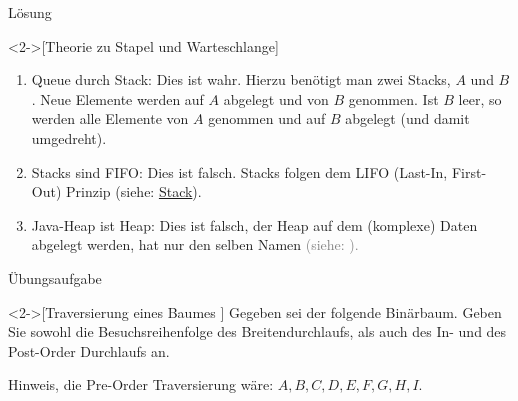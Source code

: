 \begin{frame}[c]{Lösung}
    \begin{solve}<2->[Theorie zu Stapel und Warteschlange]
        \pause{}\begin{enumerate}[<+(1)->]
            \item Queue durch Stack:\pause{} Dies ist wahr. Hierzu benötigt man zwei Stacks, \(A\) und \(B\).\pause{} Neue Elemente werden auf \(A\) abgelegt und von \(B\) genommen.\pause{} Ist \(B\) leer, so werden alle Elemente von \(A\) genommen und auf \(B\) abgelegt (und damit umgedreht).
            \item Stacks sind FIFO:\pause{} Dies ist falsch.\pause{} Stacks folgen dem LIFO (Last-In, First-Out) Prinzip (siehe: \hyperlink{mrk:Stack}{Stack}).
            \item Java-Heap ist Heap:\pause{} Dies ist falsch, der Heap auf dem (komplexe) Daten abgelegt werden,\pause{} hat nur den selben Namen \textcolor{gray}{(siehe: ).}
        \end{enumerate}
    \end{solve}
\end{frame}

\begin{frame}[c]{Übungsaufgabe}
    \begin{exercise}<2->[Traversierung eines Baumes ]
        \pause{}Gegeben sei der folgende Binärbaum. Geben Sie sowohl die Besuchsreihenfolge des Breitendurchlaufs, als auch des In- und des Post-Order Durchlaufs an.\pause{}
        \begin{center}
        \end{center}
        \pause{}Hinweis, die Pre-Order Traversierung wäre: \(A,B,C,D,E,F,G,H,I\).
    \end{exercise}
\end{frame}

